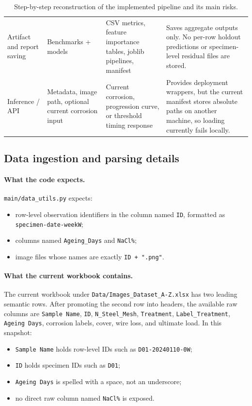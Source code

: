 \documentclass[11pt]{article}
\begin{document}
\begin{table}[H]
\begin{tabularx}{\textwidth}{p{} p{} p{} Y}
Artifact and report saving & Benchmarks + models & CSV metrics, feature importance tables, joblib pipelines, manifest & Saves aggregate outputs only. No per-row holdout predictions or specimen-level residual files are stored. \\
Inference / API & Metadata, image path, optional current corrosion input & Current corrosion, progression curve, or threshold timing response & Provides deployment wrappers, but the current manifest stores absolute paths on another machine, so loading currently fails locally. \\
\bottomrule
\end{tabularx}
\caption{Step-by-step reconstruction of the implemented pipeline and its main risks.}
\label{tab:pipeline_stages}
\end{table}

\subsection{Data ingestion and parsing details}
\paragraph{What the code expects.}
\texttt{main/data\_utils.py} expects:
\begin{itemize}
  \item row-level observation identifiers in the column named \texttt{ID}, formatted as \texttt{specimen-date-weekW};
  \item columns named \texttt{Ageing\_Days} and \texttt{NaCl\%};
  \item image files whose names are exactly \texttt{ID + ".png"}.
\end{itemize}

\paragraph{What the current workbook contains.}
The current workbook under \texttt{Data/Images\_Dataset\_A-Z.xlsx} has two leading semantic rows. After promoting the second row into headers, the available raw columns are \texttt{Sample Name}, \texttt{ID}, \texttt{N\_Steel\_Mesh}, \texttt{Treatment}, \texttt{Label\_Treatment}, \texttt{Ageing Days}, corrosion labels, cover, wire loss, and ultimate load. In this snapshot:
\begin{itemize}
  \item \texttt{Sample Name} holds row-level IDs such as \texttt{D01-20240110-0W};
  \item \texttt{ID} holds specimen IDs such as \texttt{D01};
  \item \texttt{Ageing Days} is spelled with a space, not an underscore;
  \item no direct raw column named \texttt{NaCl\%} is exposed.
\end{itemize}
\end{document}

